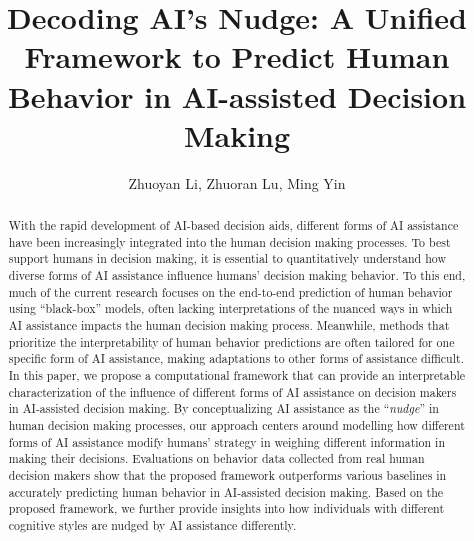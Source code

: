 \documentclass[letterpaper]{article} %
\title{Decoding AI's Nudge: 
A Unified Framework to Predict Human Behavior in AI-assisted Decision Making
}
\author {
    Zhuoyan Li,
    Zhuoran Lu,
    Ming Yin
}
\begin{document}
\maketitle

\begin{abstract}

With the rapid development of AI-based decision aids, 
different forms of AI assistance have been increasingly integrated into the human decision making processes. 
To best support humans in decision making, it is essential to quantitatively understand how diverse forms of AI assistance influence humans' decision making behavior. To this end, much of the current research focuses on the end-to-end prediction of human behavior using ``black-box'' models, often lacking interpretations of the nuanced ways in which AI assistance impacts the human decision making process. 
Meanwhile, methods that prioritize the interpretability of human behavior predictions are often tailored for one specific form of AI assistance, making adaptations to other forms of assistance difficult. 
In this paper, we propose a computational framework that can provide an interpretable characterization of the influence of different forms of AI assistance on decision makers in AI-assisted decision making.  By conceptualizing  AI assistance as the ``{\em nudge}'' in human decision making processes, our approach centers around modelling how different forms of AI assistance modify humans' strategy in weighing different information in making their decisions. Evaluations on behavior data collected from real human decision makers 
show that the proposed framework outperforms various
baselines in accurately predicting human behavior in AI-assisted decision making. Based on the proposed framework, we further provide insights into how individuals with different cognitive styles are nudged by AI assistance differently.
\end{abstract}
\end{document}
